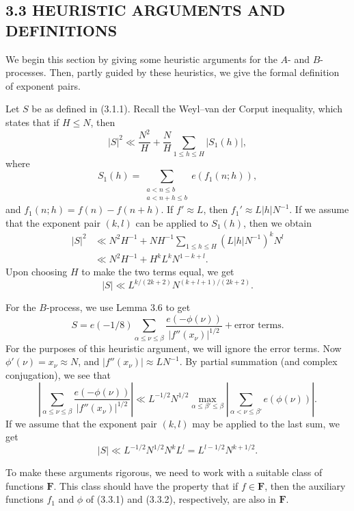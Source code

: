 \documentclass[10pt]{article}
\newcommand{\Fclass}{\mathbf{F}}
\begin{document}
\subsection*{3.3 HEURISTIC ARGUMENTS AND DEFINITIONS}

We begin this section by giving some heuristic arguments for the $A$- and
$B$-processes. Then, partly guided by these heuristics, we give the formal
definition of exponent pairs.

Let $S$ be as defined in (3.1.1). Recall the Weyl--van der Corput inequality,
which states that if $H\leq N$, then
\[
 |S|^2\ll\frac{N^2}{H}+\frac NH\sum_{1\leq h\leq H}|S_1(h)|,
\]
where
\begin{equation*}
 S_1(h)=\sum_{\substack{a<n\leq b\\a<n+h\leq b}}e(f_1(n;h)), \tag{3.3.1}
\end{equation*}
and $f_1(n;h)=f(n)-f(n+h)$. If $f'\approx L$, then
$f_1'\approx L|h|N^{-1}$. If we assume that the exponent pair $(k,l)$ can be
applied to $S_1(h)$, then we obtain
\[
\begin{aligned}
 |S|^2
 &\ll N^2H^{-1}+NH^{-1}\sum_{1\leq h\leq H}
      (L|h|N^{-1})^kN^l \\
 &\ll N^2H^{-1}+H^kL^kN^{1-k+l}.
\end{aligned}
\]
Upon choosing $H$ to make the two terms equal, we get
\[
 |S|\ll L^{k/(2k+2)}N^{(k+l+1)/(2k+2)}.
\]

For the $B$-process, we use Lemma 3.6 to get
\begin{equation*}
 S=e(-1/8)\sum_{\alpha\leq\nu\leq\beta}
 \frac{e(-\phi(\nu))}{|f''(x_\nu)|^{1/2}}+\text{error terms}. \tag{3.3.2}
\end{equation*}
For the purposes of this heuristic argument, we will ignore the error terms.
Now $\phi'(\nu)=x_\nu\approx N$, and
$|f''(x_\nu)|\approx LN^{-1}$. By partial summation (and complex conjugation),
we see that
\[
 \left|\sum_{\alpha\leq\nu\leq\beta}
 \frac{e(-\phi(\nu))}{|f''(x_\nu)|^{1/2}}\right|
 \ll L^{-1/2}N^{1/2}
 \max_{\alpha\leq\beta'\leq\beta}
 \left|\sum_{\alpha<\nu\leq\beta'}e(\phi(\nu))\right|.
\]
If we assume that the exponent pair $(k,l)$ may be applied to the last sum,
we get
\[
 |S|\ll L^{-1/2}N^{1/2}N^kL^l
 =L^{l-1/2}N^{k+1/2}.
\]

To make these arguments rigorous, we need to work with a suitable class of
functions $\Fclass$. This class should have the property that if
$f\in\Fclass$, then the auxiliary functions $f_1$ and $\phi$ of (3.3.1) and
(3.3.2), respectively, are also in $\Fclass$.
\end{document}

